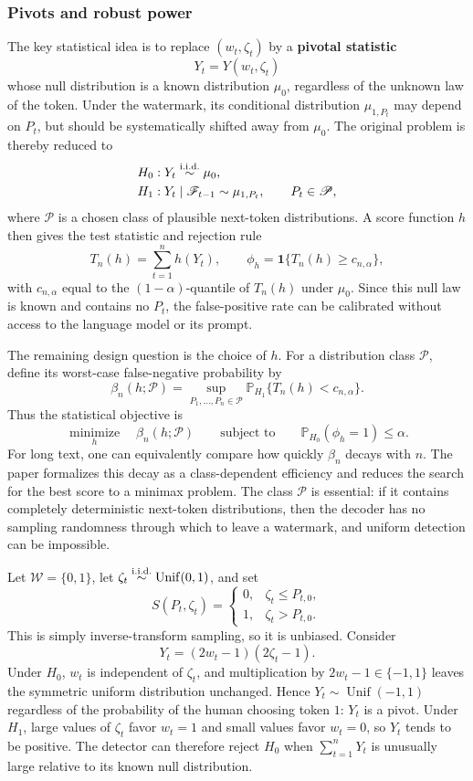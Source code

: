\subsubsection{Pivots and robust power}
The key statistical idea is to replace $(w_t,\zeta_t)$ by a \textbf{pivotal
statistic}
\[
    Y_t=Y(w_t,\zeta_t)
\]
whose null distribution is a known distribution $\mu_0$, regardless of the
unknown law of the token. Under the watermark, its conditional distribution
$\mu_{1,P_t}$ may depend on $P_t$, but should be systematically shifted away from
$\mu_0$. The original problem is thereby reduced to
\[
\begin{aligned}
    H_0 &: Y_t\overset{\text{i.i.d.}}{\sim} \mu_0,\\
    H_1 &: Y_t\mid\mathcal{F}_{t-1}\sim\mu_{1,P_t},
             \qquad P_t\in\mathcal{P},
\end{aligned}
\]
where $\mathcal{P}$ is a chosen class of plausible next-token distributions. A
score function $h$ then gives the test statistic and rejection rule
\[
    T_n(h)=\sum_{t=1}^n h(Y_t),
    \qquad
    \phi_h=\mathbf{1}\{T_n(h)\geq c_{n,\alpha}\},
\]
with $c_{n,\alpha}$ equal to the $(1-\alpha)$-quantile of $T_n(h)$ under
$\mu_0$. Since this null law is known and contains no $P_t$, the false-positive
rate can be calibrated without access to the language model or its prompt.

The remaining design question is the choice of $h$. For a distribution class
$\mathcal{P}$, define its worst-case false-negative probability by
\[
    \beta_n(h;\mathcal{P})
    =\sup_{P_1,\ldots,P_n\in\mathcal{P}}
      \mathbb{P}_{H_1}\{T_n(h)<c_{n,\alpha}\}.
\]
Thus the statistical objective is
\[
    \underset{h}{\operatorname{minimize}}\quad \beta_n(h;\mathcal{P})
    \qquad\text{subject to}\qquad
    \mathbb{P}_{H_0}(\phi_h=1)\leq\alpha.
\]
For long text, one can equivalently compare how quickly $\beta_n$ decays with
$n$. The paper formalizes this decay as a class-dependent efficiency and reduces
the search for the best score to a minimax problem. The class $\mathcal{P}$ is
essential: if it contains completely deterministic next-token distributions,
then the decoder has no sampling randomness through which to leave a watermark,
and uniform detection can be impossible.

\begin{exam}
Let $\mathcal{W}=\{0,1\}$, let $\zeta_t\overset{\text{i.i.d.}}{\sim}\operatorname{Unif}(0,1)$, and set
\[
    S(P_t,\zeta_t)=
    \begin{cases}
        0, & \zeta_t\leq P_{t,0},\\
        1, & \zeta_t>P_{t,0}.
    \end{cases}
\]
This is simply inverse-transform sampling, so it is unbiased. Consider
\[
    Y_t=(2w_t-1)(2\zeta_t-1).
\]
Under $H_0$, $w_t$ is independent of $\zeta_t$, and multiplication by
$2w_t-1\in\{-1,1\}$ leaves the symmetric uniform distribution unchanged. Hence
$Y_t\sim\operatorname{Unif}(-1,1)$ regardless of the probability of the human
choosing token $1$: $Y_t$ is a pivot. Under $H_1$, large values of $\zeta_t$
favor $w_t=1$ and small values favor $w_t=0$, so $Y_t$ tends to be positive.
The detector can therefore reject $H_0$ when $\sum_{t=1}^nY_t$ is unusually
large relative to its known null distribution.
\end{exam}
